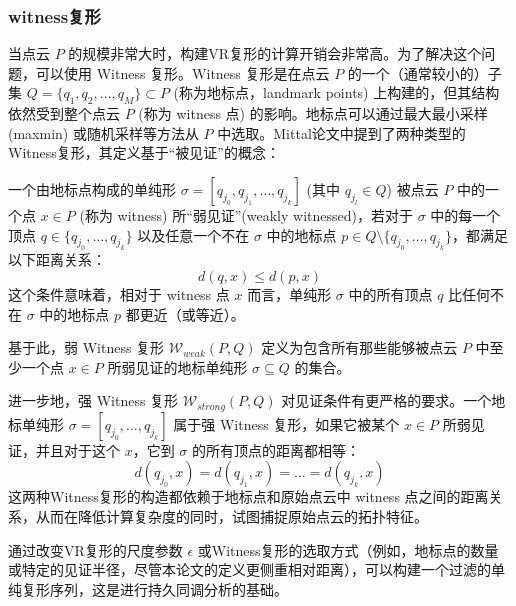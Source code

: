 \subsubsection{witness复形}
当点云 $P$ 的规模非常大时，构建VR复形的计算开销会非常高。为了解决这个问题，可以使用 Witness 复形\cite{de2004topological}。Witness 复形是在点云 $P$ 的一个（通常较小的）子集 $Q = \{q_1, q_2, \ldots, q_M\} \subset P$ (称为地标点，landmark points) 上构建的，但其结构依然受到整个点云 $P$ (称为 witness 点) 的影响。地标点可以通过最大最小采样 (maxmin) 或随机采样等方法从 $P$ 中选取。Mittal\cite{mittal2017topological}论文中提到了两种类型的Witness复形，其定义基于“被见证”的概念：

一个由地标点构成的单纯形 $\sigma = [q_{j_0}, q_{j_1}, \ldots, q_{j_k}]$ (其中 $q_{j_l} \in Q$) 被点云 $P$ 中的一个点 $x \in P$ (称为 witness) 所“弱见证”(weakly witnessed)，若对于 $\sigma$ 中的每一个顶点 $q \in \{q_{j_0}, \ldots, q_{j_k}\}$ 以及任意一个不在 $\sigma$ 中的地标点 $p \in Q \setminus \{q_{j_0}, \ldots, q_{j_k}\}$，都满足以下距离关系：
\begin{equation}
    d(q, x) \le d(p, x)
\end{equation}
这个条件意味着，相对于 witness 点 $x$ 而言，单纯形 $\sigma$ 中的所有顶点 $q$ 比任何不在 $\sigma$ 中的地标点 $p$ 都更近（或等近）。

基于此，弱 Witness 复形 $\mathcal{W}_{weak}(P, Q)$ 定义为包含所有那些能够被点云 $P$ 中至少一个点 $x \in P$ 所弱见证的地标单纯形 $\sigma \subseteq Q$ 的集合。

进一步地，强 Witness 复形 $\mathcal{W}_{strong}(P, Q)$ 对见证条件有更严格的要求。一个地标单纯形 $\sigma = [q_{j_0}, \ldots, q_{j_k}]$ 属于强 Witness 复形，如果它被某个 $x \in P$ 所弱见证，并且对于这个 $x$，它到 $\sigma$ 的所有顶点的距离都相等：
\begin{equation}
    d(q_{j_0}, x) = d(q_{j_1}, x) = \ldots = d(q_{j_k}, x)
\end{equation}
这两种Witness复形的构造都依赖于地标点和原始点云中 witness 点之间的距离关系，从而在降低计算复杂度的同时，试图捕捉原始点云的拓扑特征。

通过改变VR复形的尺度参数 $\epsilon$ 或Witness复形的选取方式（例如，地标点的数量或特定的见证半径，尽管本论文的定义更侧重相对距离），可以构建一个过滤的单纯复形序列，这是进行持久同调分析的基础。
